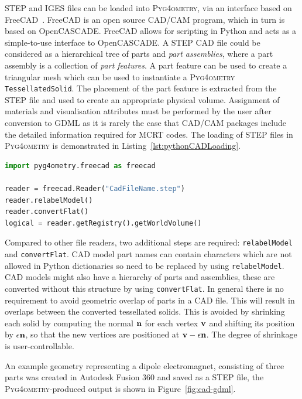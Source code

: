 \documentclass[final,5p,times,twocolumn]{elsarticle}
\newcommand{\pyinline}[1]{\lstinline[postbreak={}]{#1}}
\newcommand{\PYGEOMETRY}{\textsc{Pyg4ometry}}
\begin{document}
STEP and IGES files can be loaded into \PYGEOMETRY{}, via an interface
based on FreeCAD~\cite{FreeCAD}. FreeCAD is an open source CAD/CAM program,
which in turn is based on OpenCASCADE. FreeCAD allows for scripting in
Python and acts as a simple-to-use interface to OpenCASCADE.  A STEP CAD
file could be considered as a hierarchical tree of parts and \emph{part
  assemblies}, where a part assembly is a collection of \emph{part
  features}. A part feature can be used to create a triangular mesh which
can be used to instantiate a \PYGEOMETRY{} \pyinline{TessellatedSolid}. The
placement of the part feature is extracted from the STEP file and used to
create an appropriate physical volume. Assignment of materials and
visualisation attributes must be performed by the user after conversion to
GDML as it is rarely the case that CAD/CAM packages include the detailed
information required for MCRT codes. The loading of STEP files in
\PYGEOMETRY{} is demonstrated in Listing~\ref{lst:pythonCADLoading}.

\begin{lstlisting}[caption={A simple \PYGEOMETRY{} Python script to load a STEP file.},label={lst:pythonCADLoading}, language=Python]
import pyg4ometry.freecad as freecad

reader = freecad.Reader("CadFileName.step")
reader.relabelModel()
reader.convertFlat()
logical = reader.getRegistry().getWorldVolume()
\end{lstlisting}
Compared to other file readers, two additional steps are required: \pyinline{relabelModel} and \pyinline{convertFlat}. CAD model
part names can contain characters which are not allowed in Python
dictionaries so need to be replaced by using \pyinline{relabelModel}.
CAD models might also have a hierarchy of parts and assemblies, these are
converted without this structure by using \pyinline{convertFlat}.
In general there is no requirement to avoid geometric overlap  of parts in
a CAD file. This will result in overlaps between the converted tessellated
solids. This is avoided by shrinking each solid by computing the normal ${\bf n}$  for each
vertex ${\bf v}$ and shifting its position by $\epsilon {\bf n}$, so that
the new vertices are positioned at ${\bf v} - \epsilon {\bf n}$. The degree of shrinkage
is user-controllable.

An example geometry representing a dipole electromagnet, consisting of three parts was created in Autodesk Fusion 360
and saved as a STEP file, the \PYGEOMETRY{}-produced output is shown in Figure~\ref{fig:cad-gdml}.
\end{document}

